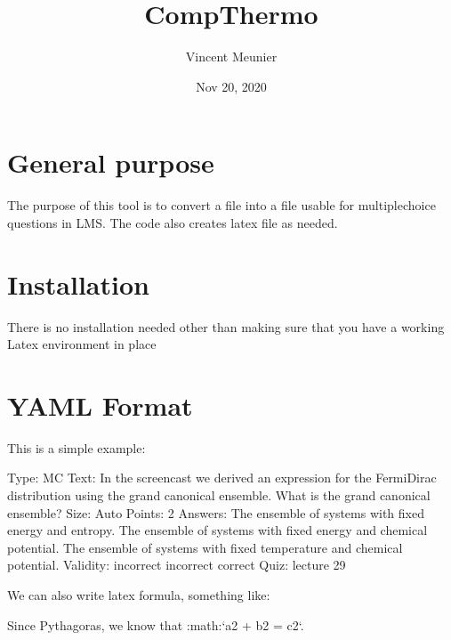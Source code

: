 \documentclass[letterpaper,10pt,english]{sphinxmanual}
\title{CompThermo}
\date{Nov 20, 2020}
\author{Vincent Meunier}
\begin{document}
\pagestyle{empty}
\sphinxmaketitle
\pagestyle{plain}
\sphinxtableofcontents
\pagestyle{normal}
\label{\detokenize{index::doc}}



\chapter{General purpose}
\label{\detokenize{index:general-purpose}}
The purpose of this tool is to convert a  file into a file usable for
multiple\sphinxhyphen{}choice questions in LMS. The code also creates latex file as needed.


\chapter{Installation}
\label{\detokenize{index:installation}}
There is no installation needed other than making sure that you have a working
Latex environment in place


\chapter{YAML Format}
\label{\detokenize{index:yaml-format}}
This is a simple example:

\begin{sphinxVerbatim}[commandchars=\\\{\}]
\PYGZhy{} Type: MC
  Text: \PYGZgt{}\PYGZhy{}
         In the screencast we derived an expression for the Fermi\PYGZhy{}Dirac distribution
       using the grand canonical ensemble. What is the grand canonical ensemble?
  Size: Auto
    Points: 2
    Answers:
      \PYGZhy{} \PYGZgt{}\PYGZhy{}
        The ensemble of systems with fixed energy and entropy.
      \PYGZhy{} \PYGZgt{}\PYGZhy{}
        The ensemble of systems with fixed energy and chemical potential.
      \PYGZhy{} \PYGZgt{}\PYGZhy{}
        The ensemble of systems with fixed temperature and chemical potential.
    Validity:
      \PYGZhy{} incorrect
      \PYGZhy{} incorrect
      \PYGZhy{} correct
    Quiz: lecture 29
\end{sphinxVerbatim}

We can also write latex formula, something like:

\begin{sphinxVerbatim}[commandchars=\\\{\}]
Since Pythagoras, we know that :math:`a\PYGZca{}2 + b\PYGZca{}2 = c\PYGZca{}2`.
\end{sphinxVerbatim}
\end{document}

